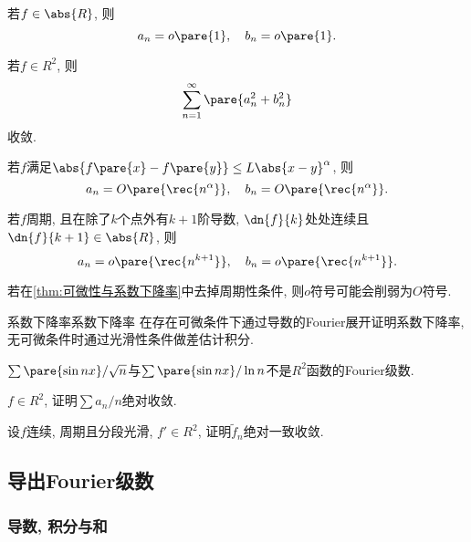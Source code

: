 \documentclass[hidelinks]{ctexart}
\begin{document}
\begin{finale}
    \begin{lemma}
        若$f\in \abs{R}$, 则
        \[ a_n=o\pare{1},\quad b_n=o\pare{1}. \]
    \end{lemma}
    \begin{lemma}[Bessel]
        若$f\in R^2$, 则
        \[ \sum_{n=1}^\infty \pare{a_n^2 + b_n^2} \]
        收敛.
    \end{lemma}
    \begin{theorem}
        若$f$满足$\abs{f\pare{x}-f\pare{y}}\le L\abs{x-y}^\alpha$, 则
        \[ a_n = O\pare{\rec{n^\alpha}},\quad b_n = O\pare{\rec{n^\alpha}}. \]
    \end{theorem}
    \begin{theorem}[可微性与系数下降率]
        \label{thm:可微性与系数下降率}
        若$f$周期, 且在除了$k$个点外有$k+1$阶导数, $\dn{f}{k}$处处连续且$\dn{f}{k+1}\in\abs{R}$, 则
        \[ a_n=o\pare{\rec{n^{k+1}}},\quad b_n=o\pare{\rec{n^{k+1}}}. \]
    \end{theorem}
\end{finale}
\begin{pitfall}
    若在\cref{thm:可微性与系数下降率}中去掉周期性条件, 则$o$符号可能会削弱为$O$符号.
\end{pitfall}
\begin{reflex}{系数下降率}{系数下降率}
    在存在可微条件下通过导数的Fourier展开证明系数下降率, 无可微条件时通过光滑性条件做差估计积分.
\end{reflex}
\begin{ex}
    $\sum \pare{\sin nx}/\sqrt{n}$与$\sum \pare{\sin nx}/\ln n$不是$R^2$函数的Fourier级数.
\end{ex}
\begin{ex}
    $f\in R^2$, 证明$\sum a_n/n$绝对收敛.
\end{ex}
\begin{ex}
    设$f$连续, 周期且分段光滑, $f'\in R^2$, 证明$\tilde{f}_n$绝对一致收敛.
\end{ex}



\subsection{导出Fourier级数} %
\label{sub:导出fourier级数}

\subsubsection{导数, 积分与和} %
\label{ssub:导数_积分与和}
\end{document}
